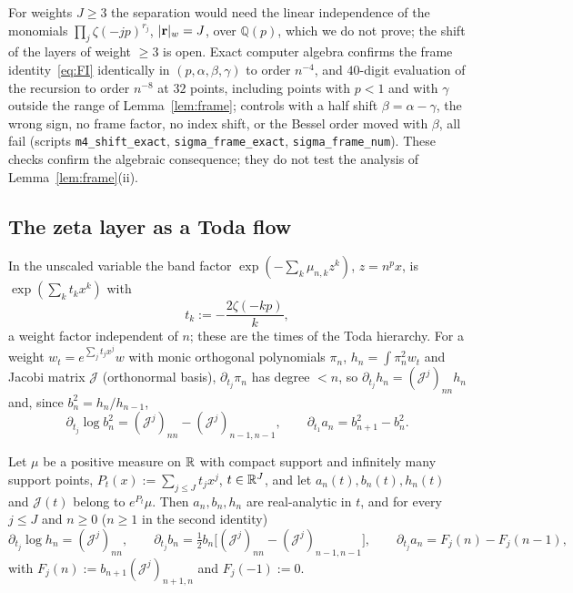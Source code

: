 For weights $J\ge3$ the separation would need the linear independence of the monomials $\prod_j\zeta(-jp)^{r_j}$, $|\mathbf r|_w=J$, over
$\mathbb Q(p)$, which we do not prove; the shift of the layers of weight $\ge3$ is open. Exact computer algebra confirms the frame
identity~\eqref{eq:FI} identically in $(p,\alpha,\beta,\gamma)$ to order $n^{-4}$, and $40$-digit evaluation of the recursion to order
$n^{-8}$ at $32$ points, including points with $p<1$ and with $\gamma$ outside the range of Lemma~\ref{lem:frame}; controls with a
half shift $\beta=\alpha-\gamma$, the wrong sign, no frame factor, no index shift, or the Bessel order moved with $\beta$, all fail
(scripts \texttt{m4\_shift\_exact}, \texttt{sigma\_frame\_exact}, \texttt{sigma\_frame\_num}). These checks confirm the algebraic
consequence; they do not test the analysis of Lemma~\ref{lem:frame}(ii).

\subsection{The zeta layer as a Toda flow}\label{sec:toda}
In the unscaled variable the band factor $\exp(-\sum_k\mu_{n,k}z^k)$, $z=n^px$, is $\exp(\sum_kt_kx^k)$ with
\begin{equation}\label{eq:todatimes}
  t_k:=-\frac{2\zeta(-kp)}k ,
\end{equation}
a weight factor independent of $n$; these are the times of the Toda hierarchy. For a weight $w_t=e^{\sum_jt_jx^j}w$ with monic
orthogonal polynomials $\pi_n$, $h_n=\int\pi_n^2w_t$ and Jacobi matrix $\mathcal J$ (orthonormal basis), $\partial_{t_j}\pi_n$ has degree
$<n$, so $\partial_{t_j}h_n=(\mathcal J^j)_{nn}h_n$ and, since $b_n^2=h_n/h_{n-1}$,
\begin{equation}\label{eq:toda}
  \partial_{t_j}\log b_n^2=(\mathcal J^j)_{nn}-(\mathcal J^j)_{n-1,n-1},\qquad \partial_{t_1}a_n=b_{n+1}^2-b_n^2 .
\end{equation}

\begin{lemma}\label{lem:todatilt}
Let $\mu$ be a positive measure on $\mathbb{R}$ with compact support and infinitely many support points, $P_t(x):=\sum_{j\le J}t_jx^j$,
$t\in\mathbb{R}^J$, and let $a_n(t),b_n(t),h_n(t)$ and $\mathcal J(t)$ belong to $e^{P_t}\mu$. Then $a_n,b_n,h_n$ are real-analytic in $t$, and
for every $j\le J$ and $n\ge0$ ($n\ge1$ in the second identity)
\[
  \partial_{t_j}\log h_n=(\mathcal J^j)_{nn},\qquad
  \partial_{t_j}b_n=\tfrac12b_n\bigl[(\mathcal J^j)_{nn}-(\mathcal J^j)_{n-1,n-1}\bigr],\qquad
  \partial_{t_j}a_n=F_j(n)-F_j(n-1),
\]
with $F_j(n):=b_{n+1}(\mathcal J^j)_{n+1,n}$ and $F_j(-1):=0$.
\end{lemma}

